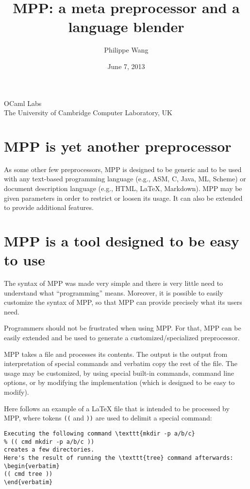 \documentclass[a4paper]{article}
\title{MPP: a meta preprocessor and a language blender}
\author{Philippe Wang}
\date{June 7, 2013}
\begin{document}
\maketitle
\begin{center}
  OCaml Labs\\
  The University of Cambridge Computer Laboratory, UK\\
\end{center}
\section{MPP is yet another preprocessor}
As some other few preprocessors, MPP
is  designed  to  be  generic  and  to be  used  with  any  text-based
programming  language (e.g.,  ASM, C,  Java, ML,  Scheme)  or document
description language  (e.g., HTML, LaTeX, Markdown). MPP  may be given
parameters in  order to restrict or  loosen its usage. It  can also be
extended to provide additional features.

\section{MPP is a tool designed to be easy to use}

The syntax of MPP was made very simple and there is very little need
to understand what ``programming'' means.  Moreover, it is possible to
easily customize the syntax of MPP, so that MPP can provide precisely
what its users need.

Programmers should not be frustrated when using MPP. For that, MPP can
be easily  extended and be  used to generate  a customized/specialized
preprocessor.

MPP takes a file and processes its contents.  The output is the output
from interpretation of special commands  and verbatim copy the rest of
the  file.  The  usage may  be customized,  by using  special built-in
commands,  command line  options, or  by modifying  the implementation
(which is designed to be easy to modify).

Here  follows an  example  of a  LaTeX  file that  is  intended to  be
processed by MPP, where tokens \texttt{((} and \texttt{))} are used to
delimit a special command:
\begin{lstlisting}
Executing the following command \texttt{mkdir -p a/b/c} 
% (( cmd mkdir -p a/b/c ))
creates a few directories.
Here's the result of running the \texttt{tree} command afterwards:
\begin{verbatim}
(( cmd tree ))
\end{verbatim}
\end{lstlisting}
\end{document}
